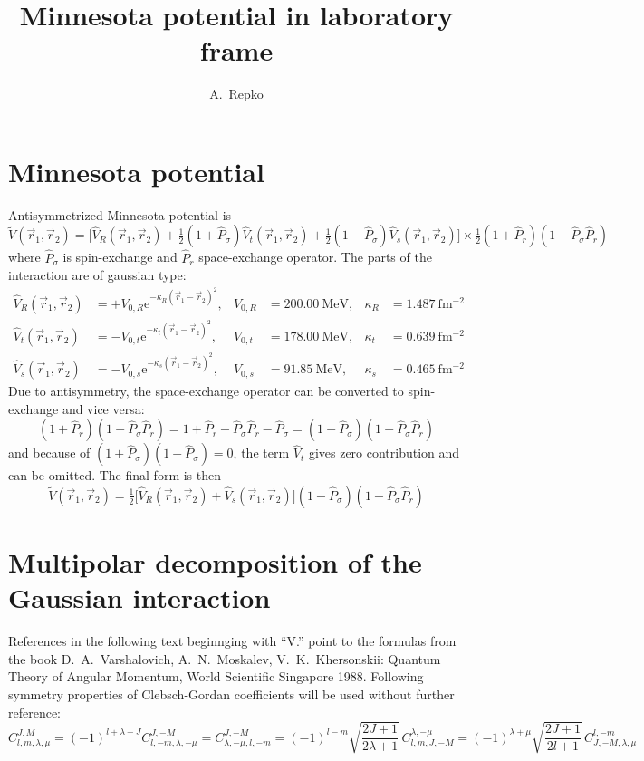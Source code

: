 \documentclass[10pt,a4paper]{article}
\author{A.~Repko}
\title{Minnesota potential in laboratory frame}
\begin{document}
\section{Minnesota potential}
Antisymmetrized Minnesota potential is
\begin{equation}
\label{Minnesota_ini}
\widetilde{V}(\vec{r}_1,\vec{r}_2) = \big[ \hat{V}_R(\vec{r}_1,\vec{r}_2)
+\tfrac{1}{2}(1+\hat{P}_\sigma)\hat{V}_t(\vec{r}_1,\vec{r}_2)
+\tfrac{1}{2}(1-\hat{P}_\sigma)\hat{V}_s(\vec{r}_1,\vec{r}_2) \big]
\times\tfrac{1}{2}(1+\hat{P}_r)(1-\hat{P}_\sigma\hat{P}_r)
\end{equation}
where $\hat{P}_\sigma$ is spin-exchange and $\hat{P}_r$ space-exchange operator. The parts of the interaction are of gaussian type:
\begin{subequations}
\begin{align}
\hat{V}_R(\vec{r}_1,\vec{r}_2) &= +V_{0,R}\mathrm{e}^{-\kappa_R(\vec{r}_1-\vec{r}_2)^2},&
V_{0,R} &=200.00\ \mathrm{MeV},& \kappa_R &=1.487\ \mathrm{fm^{-2}} \\
\hat{V}_t(\vec{r}_1,\vec{r}_2) &= -V_{0,t}\mathrm{e}^{-\kappa_t(\vec{r}_1-\vec{r}_2)^2},&
V_{0,t} &=178.00\ \mathrm{MeV},& \kappa_t &=0.639\ \mathrm{fm^{-2}} \\
\hat{V}_s(\vec{r}_1,\vec{r}_2) &= -V_{0,s}\mathrm{e}^{-\kappa_s(\vec{r}_1-\vec{r}_2)^2},&
V_{0,s} &=91.85\ \mathrm{MeV},& \kappa_s &=0.465\ \mathrm{fm^{-2}}
\end{align}
\end{subequations}
Due to antisymmetry, the space-exchange operator can be converted to spin-exchange and vice versa:
\begin{equation}
(1+\hat{P}_r)(1-\hat{P}_\sigma\hat{P}_r) = 1 + \hat{P}_r - \hat{P}_\sigma\hat{P}_r - \hat{P}_\sigma = (1-\hat{P}_\sigma)(1-\hat{P}_\sigma\hat{P}_r)
\end{equation}
and because of $(1+\hat{P}_\sigma)(1-\hat{P}_\sigma)=0$, the term $\hat{V}_t$ gives zero contribution and can be omitted. The final form is then
\begin{equation}
\label{Minnesota}
\widetilde{V}(\vec{r}_1,\vec{r}_2) = \tfrac{1}{2}\big[ \hat{V}_R(\vec{r}_1,\vec{r}_2)
+\hat{V}_s(\vec{r}_1,\vec{r}_2) \big]
(1-\hat{P}_\sigma)(1-\hat{P}_\sigma\hat{P}_r)
\end{equation}

\section{Multipolar decomposition of the Gaussian interaction}
References in the following text beginnging with ``V.'' point to the formulas from the book D.~A.~Varshalovich, A.~N.~Moskalev, V.~K.~Khersonskii: Quantum Theory of Angular Momentum, World Scientific Singapore 1988. Following symmetry properties of Clebsch-Gordan coefficients will be used without further reference:
\begin{equation}
C_{l,m,\lambda,\mu}^{J,M} = (-1)^{l+\lambda-J} C_{l,-m,\lambda,-\mu}^{J,-M}
= C_{\lambda,-\mu,l,-m}^{J,-M} =
(-1)^{l-m}\sqrt{\frac{2J+1}{2\lambda+1}}\,C_{l,m,J,-M}^{\lambda,-\mu} =
(-1)^{\lambda+\mu}\sqrt{\frac{2J+1}{2l+1}}\,C_{J,-M,\lambda,\mu}^{l,-m}
\tag{V.~8.4.10,11}
\end{equation}
\end{document}
